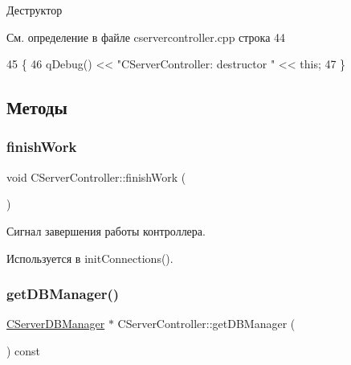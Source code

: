 Деструктор 



См. определение в файле cservercontroller.\+cpp строка 44


\begin{DoxyCode}
45 \{
46     qDebug() << \textcolor{stringliteral}{"CServerController: destructor "} << \textcolor{keyword}{this};
47 \}
\end{DoxyCode}


\subsection{Методы}
\hypertarget{class_c_server_controller_a49ac8bb325430fc9112056d862c5c117}{}\label{class_c_server_controller_a49ac8bb325430fc9112056d862c5c117} 
\subsubsection{\texorpdfstring{finish\+Work}{finishWork}}
{\footnotesize\ttfamily void C\+Server\+Controller\+::finish\+Work (\begin{DoxyParamCaption}{ }\end{DoxyParamCaption})\hspace{0.3cm}{\ttfamily [signal]}}



Сигнал завершения работы контроллера. 



Используется в init\+Connections().

\hypertarget{class_c_server_controller_a2dc0dbf4a5ee9356f10b2156ad2ce712}{}\label{class_c_server_controller_a2dc0dbf4a5ee9356f10b2156ad2ce712} 
\subsubsection{\texorpdfstring{get\+D\+B\+Manager()}{getDBManager()}}
{\footnotesize\ttfamily \hyperlink{class_c_server_d_b_manager}{C\+Server\+D\+B\+Manager} $\ast$ C\+Server\+Controller\+::get\+D\+B\+Manager (\begin{DoxyParamCaption}{ }\end{DoxyParamCaption}) const}



